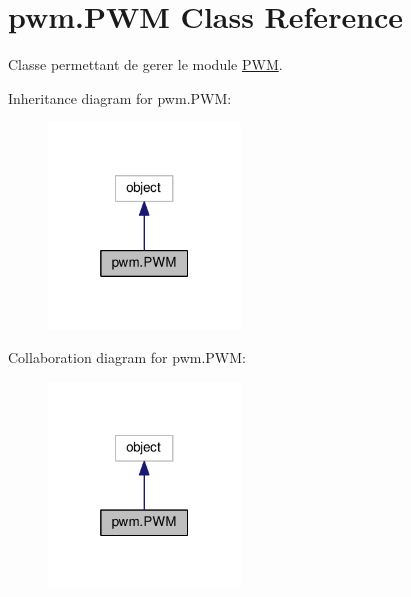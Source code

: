 \hypertarget{classpwm_1_1PWM}{}\section{pwm.\+P\+WM Class Reference}
\label{classpwm_1_1PWM}


Classe permettant de gerer le module \hyperlink{classpwm_1_1PWM}{P\+WM}.  




Inheritance diagram for pwm.\+P\+WM\+:\nopagebreak
\begin{figure}[H]
\begin{center}
\leavevmode
\includegraphics[width=145pt]{classpwm_1_1PWM__inherit__graph}
\end{center}
\end{figure}


Collaboration diagram for pwm.\+P\+WM\+:\nopagebreak
\begin{figure}[H]
\begin{center}
\leavevmode
\includegraphics[width=145pt]{classpwm_1_1PWM__coll__graph}
\end{center}
\end{figure}
